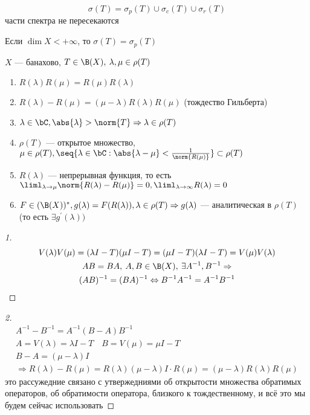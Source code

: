 \documentclass[document]{subfiles}
\begin{document}
\[ \sigma(T) = \sigma_p(T) \cup \sigma_c(T) \cup \sigma_r(T) \] 
части спектра не пересекаются

\begin{example}
    Если $\dim X < +\infty$, то $\sigma(T) = \sigma_p(T)$
\end{example}

\begin{theorem}
    $X$ --- банахово, $T \in \B(X), \: \lambda, \mu \in \rho(T)$
    \begin{enumerate}
        \item $R(\lambda) R(\mu) = R(\mu) R(\lambda)$
        \item $R(\lambda)-R(\mu)=(\mu-\lambda)R(\lambda)R(\mu)$ (тождество Гильберта) 
        \item $\lambda \in \bC, \abs{\lambda} > \norm{T} \Rightarrow \lambda \in \rho(T)$
        \item $\rho(T)$ --- открытое множество, $\mu \in \rho(T), \seq{\lambda \in \bC: \abs{\lambda - \mu} < \frac{1}{\norm{R(\mu)}}} \subset \rho(T)$
        \item $R(\lambda)$ --- непрерывная функция, то есть $\liml_{\lambda \to \mu} \norm{R(\lambda) - R(\mu)} = 0, \liml_{\lambda \to \infty} R(\lambda) = 0$
        \item $F \in (\B(X))^*, g(\lambda) = F(R(\lambda)), \lambda \in \rho(T) \Rightarrow g(\lambda)$ --- аналитическая в $\rho(T)$ (то есть $\exists g^\prime(\lambda))$
    \end{enumerate}
\end{theorem}

\begin{proof}[1]
    \begin{gather*}
        V(\lambda)V(\mu) = (\lambda I - T)(\mu I - T) = (\mu I - T)(\lambda I - T) = V(\mu)V(\lambda) \\
        AB = BA, \: A,B \in \B(X), \: \exists A^{-1}, B^{-1} \Rightarrow \\
        (AB)^{-1} = (BA)^{-1} \Leftrightarrow B^{-1}A^{-1} = A^{-1}B^{-1}
    \end{gather*}
\end{proof}

\begin{proof}[2]
    \begin{gather*}
        A^{-1} - B^{-1} = A^{-1}(B-A)B^{-1} \\
        A = V(\lambda) = \lambda I - T \quad B = V(\mu) = \mu I - T \\
        B - A = (\mu - \lambda) I \\
        \Rightarrow R(\lambda) - R(\mu) = R(\lambda)(\mu - \lambda)I \cdot R(\mu) = (\mu - \lambda)R(\lambda)R(\mu)
    \end{gather*}
    это рассужедние связано с утвержедниями об открытости множества обратимых операторов, об обратимости оператора, близкого к тождественному,
     и всё это мы будем сейчас использовать
\end{proof}
\end{document}
